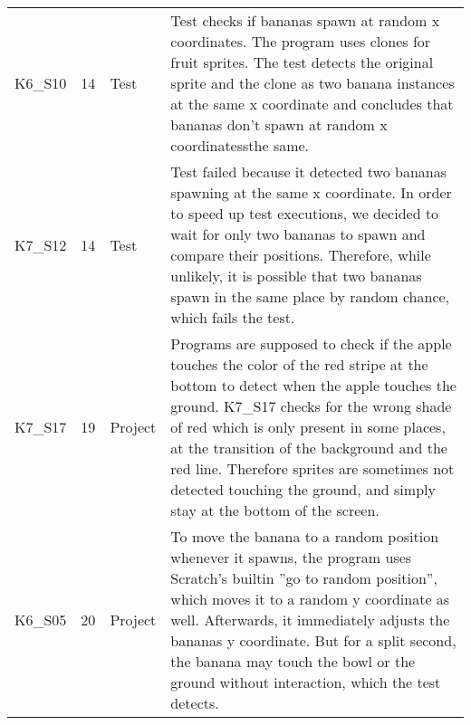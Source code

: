 \begin{table}[htpb]
{\begin{tabular}{lrlp{11.25cm}}
        K6\_S10 & 14   & Test    & Test checks if bananas spawn at random x coordinates.
                                   The program uses clones for fruit sprites.
                                   The test detects the original sprite and the clone as two banana instances at the same x coordinate and concludes that bananas don't spawn at random x coordinatessthe same. \\
        K7\_S12 & 14   & Test    & Test failed because it detected two bananas spawning at the same x coordinate.
                                   In order to speed up test executions, we decided to wait for only two bananas to spawn and compare their positions.
                                   Therefore, while unlikely, it is possible that two bananas spawn in the same place by random chance, which fails the test. \\

        K7\_S17 & 19   & Project & Programs are supposed to check if the apple touches the color of the red stripe at the bottom to detect when the apple touches the ground.
                                   K7\_S17 checks for the wrong shade of red which is only present in some places, at the transition of the background and the red line.
                                   Therefore sprites are sometimes not detected touching the ground, and simply stay at the bottom of the screen. \\

        K6\_S05 & 20   & Project & To move the banana to a random position whenever it spawns,
                                   the program uses Scratch's builtin ''go to random position'', which moves it to a random y coordinate as well.
                                   Afterwards, it immediately adjusts the bananas y coordinate.
                                   But for a split second, the banana may touch the bowl or the ground without interaction, which the test detects. \\


\end{tabular}}
\end{table}
